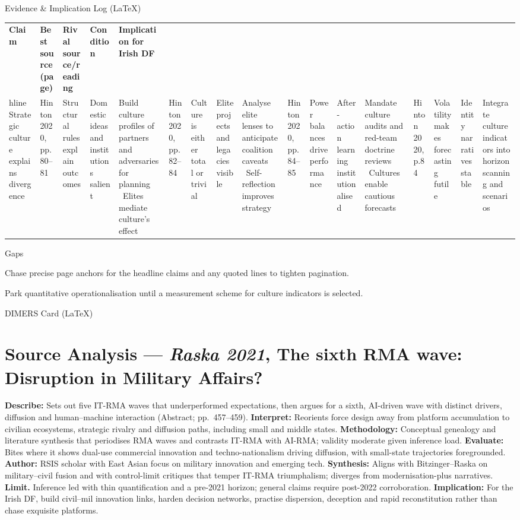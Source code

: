 Evidence & Implication Log (LaTeX)

\usepackage{array}
\begin{tabular}{p{3.2cm}p{4.2cm}p{3.6cm}p{3.2cm}p{4.2cm}}
	\textbf{Claim} & \textbf{Best source (page)} & \textbf{Rival source/reading} & \textbf{Condition} & \textbf{Implication for Irish DF}\\hline
	Strategic culture explains divergence & Hinton 2020, pp.80–81 & Structural rules explain outcomes & Domestic ideas and institutions salient & Build culture profiles of partners and adversaries for planning \
	Elites mediate culture’s effect & Hinton 2020, pp.82–84 & Culture is either total or trivial & Elite projects and legacies visible & Analyse elite lenses to anticipate coalition caveats \
	Self-reflection improves strategy & Hinton 2020, pp.84–85 & Power balances drive performance & After-action learning institutionalised & Mandate culture audits and red-team doctrine reviews \
	Cultures enable cautious forecasts & Hinton 2020, p.84 & Volatility makes forecasting futile & Identity narratives stable & Integrate culture indicators into horizon scanning and scenarios \
\end{tabular}

Gaps

Chase precise page anchors for the headline claims and any quoted lines to tighten pagination.

Park quantitative operationalisation until a measurement scheme for culture indicators is selected.

\parencite{RASKA_2021}
DIMERS Card (LaTeX)

\section*{Source Analysis — \textit{Raska 2021}, The sixth RMA wave: Disruption in Military Affairs?}
\textbf{Describe:} Sets out five IT-RMA waves that underperformed expectations, then argues for a sixth, AI-driven wave with distinct drivers, diffusion and human–machine interaction (Abstract; pp.~457–459).
\textbf{Interpret:} Reorients force design away from platform accumulation to civilian ecosystems, strategic rivalry and diffusion paths, including small and middle states.
\textbf{Methodology:} Conceptual genealogy and literature synthesis that periodises RMA waves and contrasts IT-RMA with AI-RMA; validity moderate given inference load.
\textbf{Evaluate:} Bites where it shows dual-use commercial innovation and techno-nationalism driving diffusion, with small-state trajectories foregrounded.
\textbf{Author:} RSIS scholar with East Asian focus on military innovation and emerging tech.
\textbf{Synthesis:} Aligns with Bitzinger–Raska on military–civil fusion and with control-limit critiques that temper IT-RMA triumphalism; diverges from modernisation-plus narratives.
\textbf{Limit.} Inference led with thin quantification and a pre-2021 horizon; general claims require post-2022 corroboration.
\textbf{Implication:} For the Irish DF, build civil–mil innovation links, harden decision networks, practise dispersion, deception and rapid reconstitution rather than chase exquisite platforms.

